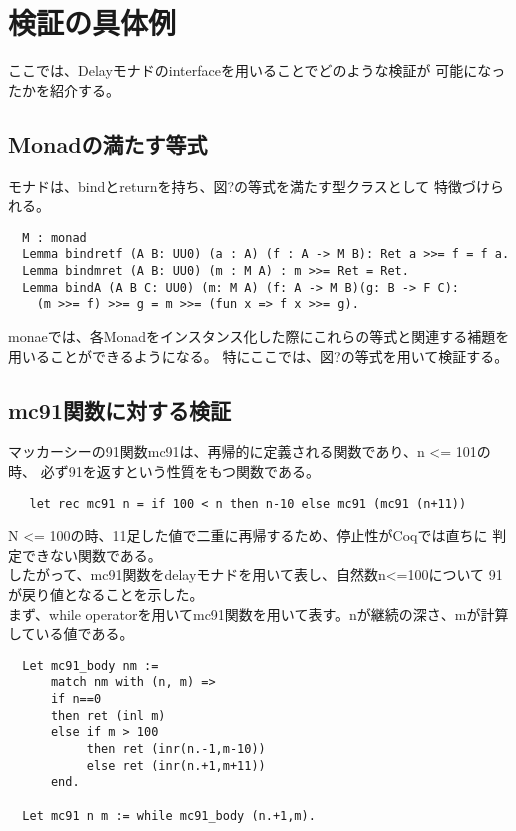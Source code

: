 \documentclass[japanese]{jssst_ppl}
\theoremstyle{definition}
\begin{document}


\section{検証の具体例}
ここでは、Delayモナドのinterfaceを用いることでどのような検証が
可能になったかを紹介する。

\subsection{Monadの満たす等式}
モナドは、bindとreturnを持ち、図?の等式を満たす型クラスとして
特徴づけられる。

\begin{verbatim}
  M : monad
  Lemma bindretf (A B: UU0) (a : A) (f : A -> M B): Ret a >>= f = f a.
  Lemma bindmret (A B: UU0) (m : M A) : m >>= Ret = Ret.
  Lemma bindA (A B C: UU0) (m: M A) (f: A -> M B)(g: B -> F C): 
    (m >>= f) >>= g = m >>= (fun x => f x >>= g).
\end{verbatim}





monaeでは、各Monadをインスタンス化した際にこれらの等式と関連する補題を
用いることができるようになる。
特にここでは、図?の等式を用いて検証する。





\subsection{mc91関数に対する検証}
マッカーシーの91関数mc91は、再帰的に定義される関数であり、n <= 101の時、
必ず91を返すという性質をもつ関数である。

\begin{verbatim}
   let rec mc91 n = if 100 < n then n-10 else mc91 (mc91 (n+11))
   \end{verbatim}

N <= 100の時、11足した値で二重に再帰するため、停止性がCoqでは直ちに
判定できない関数である。\\
したがって、mc91関数をdelayモナドを用いて表し、自然数n<=100について
91が戻り値となることを示した。\\
まず、while operatorを用いてmc91関数を用いて表す。nが継続の深さ、mが計算している値である。



\begin{verbatim}
  Let mc91_body nm :=
      match nm with (n, m) =>
      if n==0
      then ret (inl m)
      else if m > 100
           then ret (inr(n.-1,m-10))
           else ret (inr(n.+1,m+11))
      end.
  
  Let mc91 n m := while mc91_body (n.+1,m).
    \end{verbatim}
\end{document}
